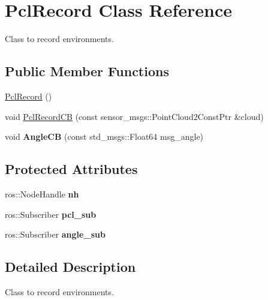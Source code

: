 \hypertarget{classPclRecord}{}\section{Pcl\+Record Class Reference}
\label{classPclRecord}


Class to record environments.  


\subsection*{Public Member Functions}
\begin{DoxyCompactItemize}
\item 
\hyperlink{classPclRecord_adcde62c71c552ef09800920d24e313e2}{Pcl\+Record} ()
\item 
void \hyperlink{classPclRecord_a19c604de9fbe99982ed880c5556a429b}{Pcl\+Record\+CB} (const sensor\+\_\+msgs\+::\+Point\+Cloud2\+Const\+Ptr \&cloud)
\item 
void {\bfseries Angle\+CB} (const std\+\_\+msgs\+::\+Float64 msg\+\_\+angle)\hypertarget{classPclRecord_afd60b0301ae3d8a4b00e29d195d4345d}{}\label{classPclRecord_afd60b0301ae3d8a4b00e29d195d4345d}

\end{DoxyCompactItemize}
\subsection*{Protected Attributes}
\begin{DoxyCompactItemize}
\item 
ros\+::\+Node\+Handle {\bfseries nh}\hypertarget{classPclRecord_acdce8386b8daeb1d3a5da49b0e1acf41}{}\label{classPclRecord_acdce8386b8daeb1d3a5da49b0e1acf41}

\item 
ros\+::\+Subscriber {\bfseries pcl\+\_\+sub}\hypertarget{classPclRecord_ada2acf1a126c6b6ad0593ded229321df}{}\label{classPclRecord_ada2acf1a126c6b6ad0593ded229321df}

\item 
ros\+::\+Subscriber {\bfseries angle\+\_\+sub}\hypertarget{classPclRecord_a26421aa8c5e60cf4561aba798ea8623f}{}\label{classPclRecord_a26421aa8c5e60cf4561aba798ea8623f}

\end{DoxyCompactItemize}


\subsection{Detailed Description}
Class to record environments. 

